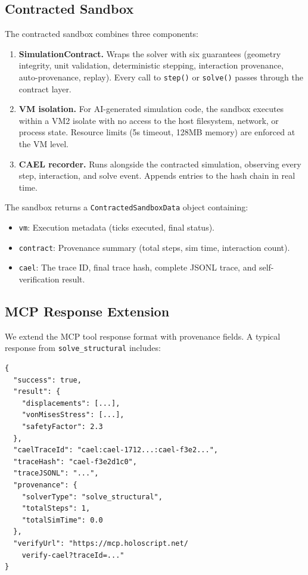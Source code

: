 \documentclass[letterpaper,twocolumn,10pt]{article}
\begin{document}
\subsection{Contracted Sandbox}

The contracted sandbox combines three components:

\begin{enumerate}[nosep,leftmargin=*]
\item \textbf{SimulationContract.} Wraps the solver with six guarantees
  (geometry integrity, unit validation, deterministic stepping, interaction
  provenance, auto-provenance, replay). Every call to \texttt{step()} or
  \texttt{solve()} passes through the contract layer.
\item \textbf{VM isolation.} For AI-generated simulation code, the sandbox
  executes within a VM2 isolate with no access to the host filesystem,
  network, or process state. Resource limits (5s timeout, 128MB memory) are
  enforced at the VM level.
\item \textbf{CAEL recorder.} Runs alongside the contracted simulation,
  observing every step, interaction, and solve event. Appends entries to the
  hash chain in real time.
\end{enumerate}

The sandbox returns a \texttt{ContractedSandboxData} object containing:

\begin{itemize}[nosep,leftmargin=*]
\item \texttt{vm}: Execution metadata (ticks executed, final status).
\item \texttt{contract}: Provenance summary (total steps, sim time,
  interaction count).
\item \texttt{cael}: The trace ID, final trace hash, complete JSONL trace,
  and self-verification result.
\end{itemize}

\subsection{MCP Response Extension}

We extend the MCP tool response format with provenance fields. A typical
response from \texttt{solve\_structural} includes:

\begin{lstlisting}[language={},numbers=none]
{
  "success": true,
  "result": {
    "displacements": [...],
    "vonMisesStress": [...],
    "safetyFactor": 2.3
  },
  "caelTraceId": "cael:cael-1712...:cael-f3e2...",
  "traceHash": "cael-f3e2d1c0",
  "traceJSONL": "...",
  "provenance": {
    "solverType": "solve_structural",
    "totalSteps": 1,
    "totalSimTime": 0.0
  },
  "verifyUrl": "https://mcp.holoscript.net/
    verify-cael?traceId=..."
}
\end{lstlisting}
\end{document}
